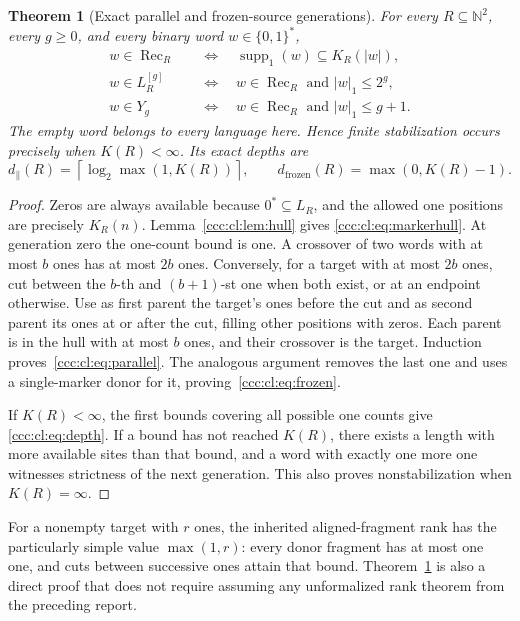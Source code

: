 \documentclass[11pt,letterpaper]{article}
\newtheorem{theorem}{Theorem}[section]
\theoremstyle{definition}
\theoremstyle{remark}
\newcommand{\N}{\mathbb N}
\newcommand{\rec}{\operatorname{Rec}}
\newcommand{\gen}[2]{#1^{[#2]}}
\newcommand{\clog}[1]{\left\lceil\log_2 #1\right\rceil}
\newcommand{\supp}{\operatorname{supp}}
\begin{document}
\begin{theorem}[Exact parallel and frozen-source generations]\label{ccc:cl:thm:generations}
For every $R\subseteq\N^2$, every $g\ge0$, and every binary word
$w\in\{0,1\}^*$,
\begin{align}
 w\in\rec_R&\quad\Longleftrightarrow\quad
             \supp_1(w)\subseteq K_R(|w|),\label{ccc:cl:eq:markerhull}\\
 w\in\gen{L_R}g&\quad\Longleftrightarrow\quad
             w\in\rec_R\text{ and }|w|_1\le2^g,\label{ccc:cl:eq:parallel}\\
 w\in Y_g&\quad\Longleftrightarrow\quad
             w\in\rec_R\text{ and }|w|_1\le g+1.\label{ccc:cl:eq:frozen}
\end{align}
The empty word belongs to every language here. Hence finite stabilization
occurs precisely when $K(R)<\infty$. Its exact depths are
\begin{equation}\label{ccc:cl:eq:depth}
 d_{\parallel}(R)=\clog{\max(1,K(R))},\qquad
 d_{\mathrm{frozen}}(R)=\max(0,K(R)-1).
\end{equation}
\end{theorem}
\begin{proof}
Zeros are always available because $0^*\subseteq L_R$, and the allowed one
positions are precisely $K_R(n)$. Lemma~\ref{ccc:cl:lem:hull} gives
\eqref{ccc:cl:eq:markerhull}. At generation zero the one-count bound is one.
A crossover of two words with at most $b$ ones has at most $2b$ ones.
Conversely, for a target with at most $2b$ ones, cut between the $b$-th and
$(b+1)$-st one when both exist, or at an endpoint otherwise. Use as first
parent the target's ones before the cut and as second parent its ones
at or after the cut, filling other positions with zeros. Each parent is
in the hull with at most $b$ ones, and their crossover is the target.
Induction proves~\eqref{ccc:cl:eq:parallel}. The analogous argument removes the
last one and uses a single-marker donor for it, proving~\eqref{ccc:cl:eq:frozen}.

If $K(R)<\infty$, the first bounds covering all possible one counts give
\eqref{ccc:cl:eq:depth}. If a bound has not reached $K(R)$, there exists a length
with more available sites than that bound, and a word with exactly one
more one witnesses strictness of the next generation. This also proves
nonstabilization when $K(R)=\infty$.
\end{proof}

For a nonempty target with $r$ ones, the inherited aligned-fragment rank
has the particularly simple value $\max(1,r)$: every donor fragment has
at most one one, and cuts between successive ones attain that bound.
Theorem~\ref{ccc:cl:thm:generations} is also a direct proof that does not require
assuming any unformalized rank theorem from the preceding report.
\end{document}

